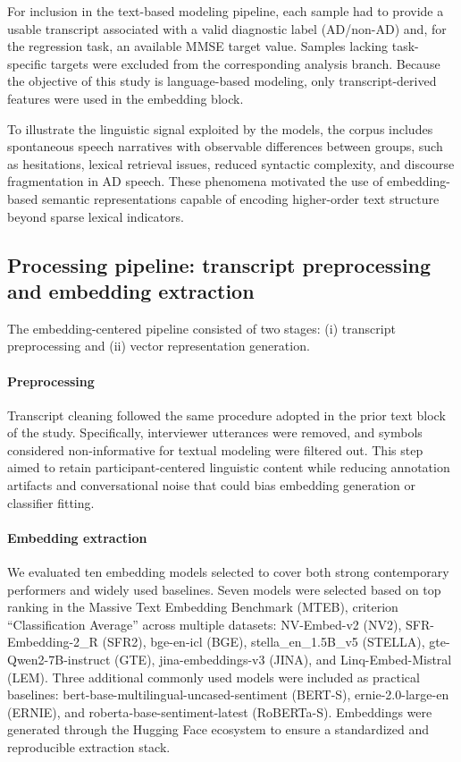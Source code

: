 \documentclass[final,5p,times]{elsarticle}
\begin{document}
For inclusion in the text-based modeling pipeline, each sample had to provide a usable transcript associated with a valid diagnostic label (AD/non-AD) and, for the regression task, an available MMSE target value. Samples lacking task-specific targets were excluded from the corresponding analysis branch. Because the objective of this study is language-based modeling, only transcript-derived features were used in the embedding block.

To illustrate the linguistic signal exploited by the models, the corpus includes spontaneous speech narratives with observable differences between groups, such as hesitations, lexical retrieval issues, reduced syntactic complexity, and discourse fragmentation in AD speech. These phenomena motivated the use of embedding-based semantic representations capable of encoding higher-order text structure beyond sparse lexical indicators.

\subsection{Processing pipeline: transcript preprocessing and embedding extraction}

The embedding-centered pipeline consisted of two stages: (i) transcript preprocessing and (ii) vector representation generation.

\paragraph{Preprocessing}
Transcript cleaning followed the same procedure adopted in the prior text block of the study. Specifically, interviewer utterances were removed, and symbols considered non-informative for textual modeling were filtered out. This step aimed to retain participant-centered linguistic content while reducing annotation artifacts and conversational noise that could bias embedding generation or classifier fitting.

\paragraph{Embedding extraction}
We evaluated ten embedding models selected to cover both strong contemporary performers and widely used baselines. Seven models were selected based on top ranking in the Massive Text Embedding Benchmark (MTEB), criterion “Classification Average” across multiple datasets: NV-Embed-v2 (NV2), SFR-Embedding-2\_R (SFR2), bge-en-icl (BGE), stella\_en\_1.5B\_v5 (STELLA), gte-Qwen2-7B-instruct (GTE), jina-embeddings-v3 (JINA), and Linq-Embed-Mistral (LEM). Three additional commonly used models were included as practical baselines: bert-base-multilingual-uncased-sentiment (BERT-S), ernie-2.0-large-en (ERNIE), and roberta-base-sentiment-latest (RoBERTa-S). Embeddings were generated through the Hugging Face ecosystem to ensure a standardized and reproducible extraction stack.
\end{document}
